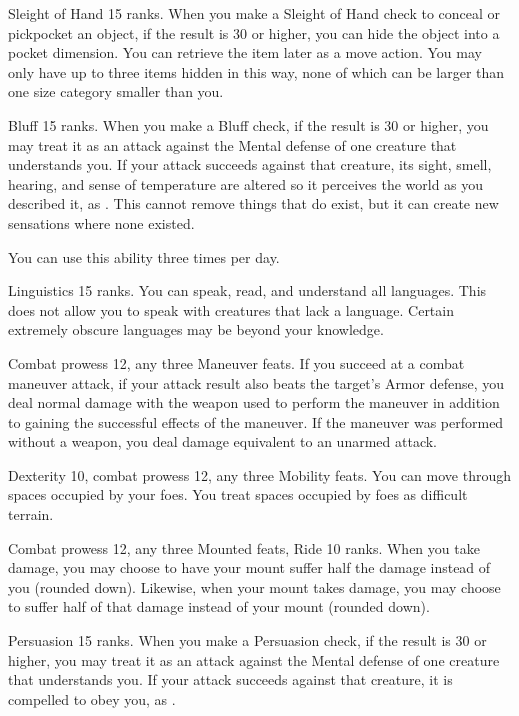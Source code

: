 \featpre Sleight of Hand 15 ranks.
\featben When you make a Sleight of Hand check to conceal or pickpocket an object, if the result is 30 or higher, you can hide the object into a pocket dimension.
You can retrieve the item later as a move action.
You may only have up to three items hidden in this way, none of which can be larger than one size category smaller than you.

\featpre Bluff 15 ranks.
\featben When you make a Bluff check, if the result is 30 or higher, you may treat it as an attack against the Mental defense of one creature that understands you.
If your attack succeeds against that creature, its sight, smell, hearing, and sense of temperature are altered so it perceives the world as you described it, as .
This cannot remove things that do exist, but it can create new sensations where none existed.

You can use this ability three times per day.

\featpre Linguistics 15 ranks.
\featben You can speak, read, and understand all languages.
This does not allow you to speak with creatures that lack a language.
Certain extremely obscure languages may be beyond your knowledge.

\featpres Combat prowess 12, any three Maneuver feats.
\featben If you succeed at a combat maneuver attack, if your attack result also beats the target's Armor defense, you deal normal damage with the weapon used to perform the maneuver in addition to gaining the successful effects of the maneuver.
If the maneuver was performed without a weapon, you deal damage equivalent to an unarmed attack.

\featpres Dexterity 10, combat prowess 12, any three Mobility feats.
\featben You can move through spaces occupied by your foes.
You treat spaces occupied by foes as difficult terrain.

\featpres Combat prowess 12, any three Mounted feats, Ride 10 ranks.
\featben When you take damage, you may choose to have your mount suffer half the damage instead of you (rounded down).
Likewise, when your mount takes damage, you may choose to suffer half of that damage instead of your mount (rounded down).

\featpre Persuasion 15 ranks.
\featben When you make a Persuasion check, if the result is 30 or higher, you may treat it as an attack against the Mental defense of one creature that understands you.
If your attack succeeds against that creature, it is compelled to obey you, as .

